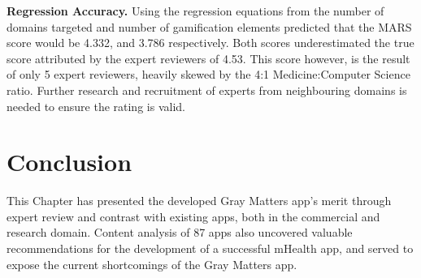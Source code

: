 \textbf{Regression Accuracy.} Using the regression equations from the number of domains targeted and number of gamification elements predicted that the MARS score would be 4.332, and 3.786 respectively.
Both scores underestimated the true score attributed by the expert reviewers of 4.53. This score however, is the result of only 5 expert reviewers, heavily skewed by the 4:1 Medicine:Computer Science ratio. Further research and recruitment of experts from neighbouring domains is needed to ensure the rating is valid.

\section{Conclusion}
This Chapter has presented the developed Gray Matters app's merit through expert review and contrast with existing apps, both in the commercial and research domain. Content analysis of 87 apps also uncovered valuable recommendations for the development of a successful mHealth app, and served to expose the current shortcomings of the Gray Matters app.

